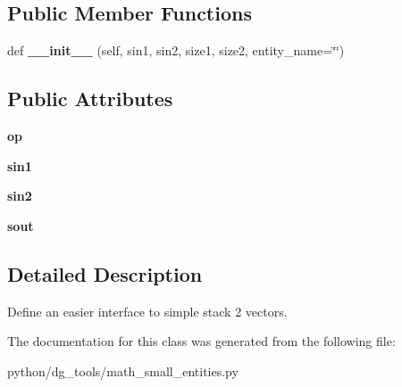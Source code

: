 \subsection*{Public Member Functions}
\begin{DoxyCompactItemize}
\item 
def {\bfseries \+\_\+\+\_\+init\+\_\+\+\_\+} (self, sin1, sin2, size1, size2, entity\+\_\+name=\char`\"{}\char`\"{})\hypertarget{classpython_1_1dg__tools_1_1math__small__entities_1_1Stack2Vectors_a5082e1981a9de6406aa09129bee0b347}{}\label{classpython_1_1dg__tools_1_1math__small__entities_1_1Stack2Vectors_a5082e1981a9de6406aa09129bee0b347}

\end{DoxyCompactItemize}
\subsection*{Public Attributes}
\begin{DoxyCompactItemize}
\item 
{\bfseries op}\hypertarget{classpython_1_1dg__tools_1_1math__small__entities_1_1Stack2Vectors_aee9133206d4944bf94d2be498aaa2c7e}{}\label{classpython_1_1dg__tools_1_1math__small__entities_1_1Stack2Vectors_aee9133206d4944bf94d2be498aaa2c7e}

\item 
{\bfseries sin1}\hypertarget{classpython_1_1dg__tools_1_1math__small__entities_1_1Stack2Vectors_ab524298b794cbd1f5d8b239bda6f717c}{}\label{classpython_1_1dg__tools_1_1math__small__entities_1_1Stack2Vectors_ab524298b794cbd1f5d8b239bda6f717c}

\item 
{\bfseries sin2}\hypertarget{classpython_1_1dg__tools_1_1math__small__entities_1_1Stack2Vectors_aeac6844b2c195cfc85d5a2368d491e21}{}\label{classpython_1_1dg__tools_1_1math__small__entities_1_1Stack2Vectors_aeac6844b2c195cfc85d5a2368d491e21}

\item 
{\bfseries sout}\hypertarget{classpython_1_1dg__tools_1_1math__small__entities_1_1Stack2Vectors_a3a20ad03d0a52ffac73e11e8b786253b}{}\label{classpython_1_1dg__tools_1_1math__small__entities_1_1Stack2Vectors_a3a20ad03d0a52ffac73e11e8b786253b}

\end{DoxyCompactItemize}


\subsection{Detailed Description}
Define an easier interface to simple stack 2 vectors. 

The documentation for this class was generated from the following file\+:\begin{DoxyCompactItemize}
\item 
python/dg\+\_\+tools/math\+\_\+small\+\_\+entities.\+py\end{DoxyCompactItemize}
